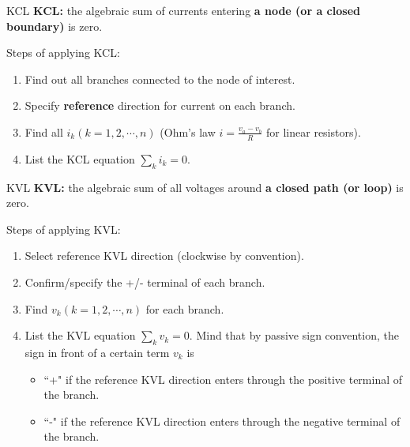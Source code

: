 \documentclass{beamer}
\begin{document}
\begin{frame}{KCL}
\textbf{KCL:} the algebraic sum of currents entering \textbf{a node (or a closed boundary)} is zero.

Steps of applying KCL:
\begin{enumerate}
    \item Find out all branches connected to the node of interest.
    \item Specify \textbf{reference} direction for current on each branch.
    \item Find all $i_k (k=1,2,\cdots,n)$ (Ohm's law $i=\frac{v_a-v_b}{R}$ for linear resistors).
    \item List the KCL equation $\sum_{k} i_k = 0$.
\end{enumerate}



\end{frame}

\begin{frame}{KVL}
\textbf{KVL:} the algebraic sum of all voltages around \textbf{a closed path (or loop)} is zero.

Steps of applying KVL:
\begin{enumerate}
    \item Select reference KVL direction (clockwise by convention).
    \item Confirm/specify the +/- terminal of each branch.
    \item Find $v_k (k=1,2,\cdots,n)$ for each branch.
    \item List the KVL equation $\sum_kv_k=0$. Mind that by passive sign convention, the sign in front of a certain term $v_k$ is 
    \begin{itemize}
        \item ``+" if the reference KVL direction enters through the positive terminal of the branch.
        \item ``-" if the reference KVL direction enters through the negative terminal of the branch.
    \end{itemize}
\end{enumerate}

\end{frame}



\end{document}
